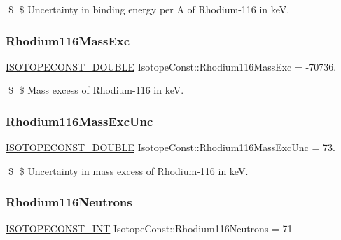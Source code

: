 \$ \$ Uncertainty in binding energy per A of Rhodium-\/116 in keV. \mbox{\label{group___isotope_const-_rhodium-_rh116_ga5a13323d5212973273c905632df6578c}} 
\subsubsection{\texorpdfstring{Rhodium116\+Mass\+Exc}{Rhodium116MassExc}}
{\footnotesize\ttfamily \mbox{\hyperlink{group___isotope_const-_macros_ga8f45a7272ce02c0b4c65c44636ed719a}{I\+S\+O\+T\+O\+P\+E\+C\+O\+N\+S\+T\+\_\+\+D\+O\+U\+B\+LE}} Isotope\+Const\+::\+Rhodium116\+Mass\+Exc = -\/70736.}

\$ \$ Mass excess of Rhodium-\/116 in keV. \mbox{\label{group___isotope_const-_rhodium-_rh116_ga0837a4920b1e754181035a74e725055c}} 
\subsubsection{\texorpdfstring{Rhodium116\+Mass\+Exc\+Unc}{Rhodium116MassExcUnc}}
{\footnotesize\ttfamily \mbox{\hyperlink{group___isotope_const-_macros_ga8f45a7272ce02c0b4c65c44636ed719a}{I\+S\+O\+T\+O\+P\+E\+C\+O\+N\+S\+T\+\_\+\+D\+O\+U\+B\+LE}} Isotope\+Const\+::\+Rhodium116\+Mass\+Exc\+Unc = 73.}

\$ \$ Uncertainty in mass excess of Rhodium-\/116 in keV. \mbox{\label{group___isotope_const-_rhodium-_rh116_ga1b0c37d35e3c877b98798c14b5890098}} 
\subsubsection{\texorpdfstring{Rhodium116\+Neutrons}{Rhodium116Neutrons}}
{\footnotesize\ttfamily \mbox{\hyperlink{group___isotope_const-_macros_ga5f18360b3e99483a35c32d789e62621c}{I\+S\+O\+T\+O\+P\+E\+C\+O\+N\+S\+T\+\_\+\+I\+NT}} Isotope\+Const\+::\+Rhodium116\+Neutrons = 71}

